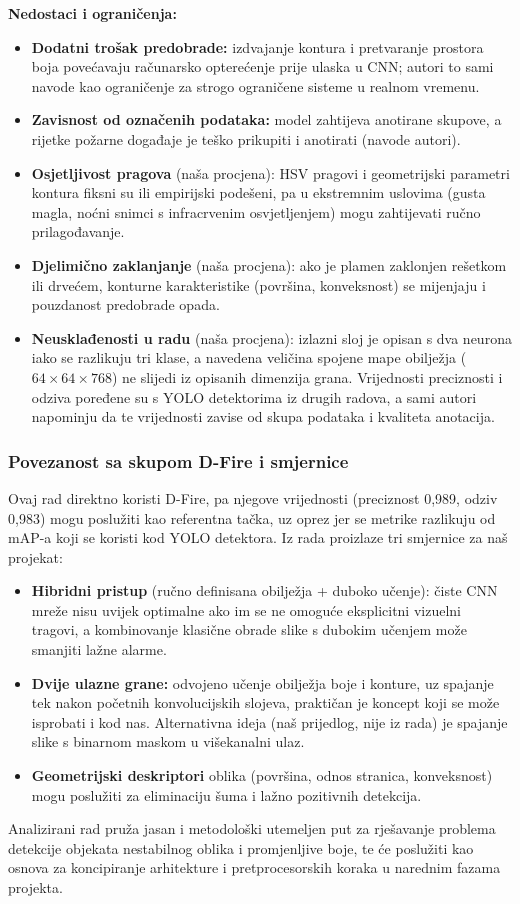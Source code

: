 \textbf{Nedostaci i ograničenja:}
\begin{itemize}
  \item \textbf{Dodatni trošak predobrade:} izdvajanje kontura i pretvaranje prostora boja povećavaju računarsko opterećenje prije ulaska u CNN; autori to sami navode kao ograničenje za strogo ograničene sisteme u realnom vremenu.
  \item \textbf{Zavisnost od označenih podataka:} model zahtijeva anotirane skupove, a rijetke požarne događaje je teško prikupiti i anotirati (navode autori).
  \item \textbf{Osjetljivost pragova} (naša procjena): HSV pragovi i geometrijski parametri kontura fiksni su ili empirijski podešeni, pa u ekstremnim uslovima (gusta magla, noćni snimci s infracrvenim osvjetljenjem) mogu zahtijevati ručno prilagođavanje.
  \item \textbf{Djelimično zaklanjanje} (naša procjena): ako je plamen zaklonjen rešetkom ili drvećem, konturne karakteristike (površina, konveksnost) se mijenjaju i pouzdanost predobrade opada.
  \item \textbf{Neusklađenosti u radu} (naša procjena): izlazni sloj je opisan s dva neurona iako se razlikuju tri klase, a navedena veličina spojene mape obilježja ($64\times 64\times 768$) ne slijedi iz opisanih dimenzija grana. Vrijednosti preciznosti i odziva poređene su s YOLO detektorima iz drugih radova, a sami autori napominju da te vrijednosti zavise od skupa podataka i kvaliteta anotacija.
\end{itemize}

\subsubsection{Povezanost sa skupom D-Fire i smjernice}
Ovaj rad direktno koristi D-Fire, pa njegove vrijednosti (preciznost 0,989, odziv 0,983) mogu poslužiti kao referentna tačka, uz oprez jer se metrike razlikuju od mAP-a koji se koristi kod YOLO detektora. Iz rada proizlaze tri smjernice za naš projekat:
\begin{itemize}
  \item \textbf{Hibridni pristup} (ručno definisana obilježja + duboko učenje): čiste CNN mreže nisu uvijek optimalne ako im se ne omoguće eksplicitni vizuelni tragovi, a kombinovanje klasične obrade slike s dubokim učenjem može smanjiti lažne alarme.
  \item \textbf{Dvije ulazne grane:} odvojeno učenje obilježja boje i konture, uz spajanje tek nakon početnih konvolucijskih slojeva, praktičan je koncept koji se može isprobati i kod nas. Alternativna ideja (naš prijedlog, nije iz rada) je spajanje slike s binarnom maskom u višekanalni ulaz.
  \item \textbf{Geometrijski deskriptori} oblika (površina, odnos stranica, konveksnost) mogu poslužiti za eliminaciju šuma i lažno pozitivnih detekcija.
\end{itemize}
Analizirani rad pruža jasan i metodološki utemeljen put za rješavanje problema detekcije objekata nestabilnog oblika i promjenljive boje, te će poslužiti kao osnova za koncipiranje arhitekture i pretprocesorskih koraka u narednim fazama projekta.

